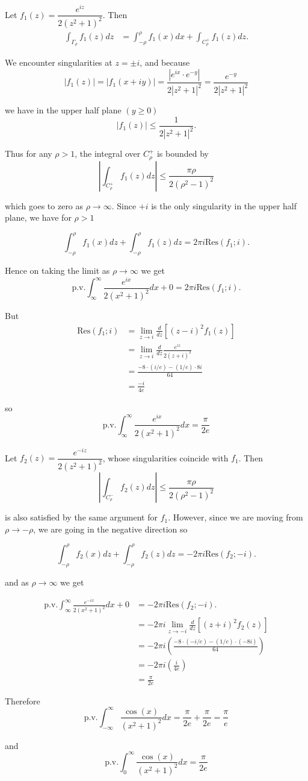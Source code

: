 \documentclass[12pt]{article}
\begin{document}
Let $f_1(z) = \dfrac{e^{iz}}{2(z^2 + 1)^2}$. Then
\begin{align*}
	\int_{\Gamma_{\rho}} f_1(z)dz &= \int_{-\rho}^{\rho} f_1(x)dx + \int_{C_{\rho}^{+}}f_1(z)dz. 
\end{align*}

We encounter singularities at $z = \pm i$, and because
\[
	|f_1(z)| = |f_1(x + iy)| = \frac{\left|e^{ix}\cdot e^{-y}\right|}{2|z^2 + 1|^2} = \frac{e^{-y}}{2|z^2 + 1|^2}
\]

we have in the upper half plane $(y \ge 0)$
\[
	|f_1(z)| \le \frac{1}{2|z^2 + 1|^2}.
\]

Thus for any $\rho > 1$, the integral over $C_{\rho}^{+}$ is bounded by
\[
	\left|\int_{C_{\rho}^{+}} f_1(z)dz\right| \le  \frac{\pi \rho}{2(\rho^2 - 1)^2}
\]

which goes to zero as $\rho \to \infty$. Since $+i$ is the only singularity in the upper half plane, we have for $\rho > 1$

\[
	\int_{-\rho}^{\rho} f_1(x)dz + \int_{-\rho}^{\rho} f_1(z)dz = 2\pi i \text{Res}(f_1; i).
\]

Hence on taking the limit as $\rho \to \infty$ we get
\[
	\text{p.v.}\int_{\infty}^{\infty} \frac{e^{ix}}{2(x^2 + 1)^2}dx + 0 = 2\pi i\text{Res}(f_1; i).
\]

But
\begin{align*}
	\text{Res}(f_1; i) &= \lim_{z \to i} \frac{d}{dz} [(z - i)^2f_1(z)] \\
			   &= \lim_{z \to i} \frac{d}{dz} \frac{e^{iz}}{2(z + i)^2} \\
			   &= \frac{-8\cdot(i/e) - (1/e)\cdot8i}{64} \\
			   &= \frac{-i}{4e}
\end{align*}

so
\[
	\text{p.v.}\int_{\infty}^{\infty} \frac{e^{ix}}{2(x^2 + 1)^2}dx = \frac{\pi}{2e}
\]

Let $f_2(z) = \dfrac{e^{-iz}}{2(z^2 + 1)^2}$, whose singularities coincide with $f_1$. Then
\[
	\left|\int_{C_{\rho}^{-}} f_2(z)dz\right| \le  \frac{\pi \rho}{2(\rho^2 - 1)^2}
\]

is also satisfied by the same argument for $f_1$. However, since we are moving from $\rho \to -\rho$, we are going in the negative direction so

\[
	\int_{-\rho}^{\rho} f_2(x)dz + \int_{-\rho}^{\rho} f_2(z)dz = -2\pi i \text{Res}(f_2; -i).	
\]

and as $\rho \to \infty$ we get

\begin{align*}
	\text{p.v.}\int_{\infty}^{\infty} \frac{e^{-ix}}{2(x^2 + 1)^2}dx + 0 &= -2\pi i\text{Res}(f_2; -i). \\
									     &= -2\pi i \lim_{z \to -i} \frac{d}{dz}[(z + i)^2f_2(z)] \\
									     &= -2\pi i \left(\frac{-8\cdot(-i/e) - (1/e)\cdot(-8i)}{64}\right) \\
									     &= -2\pi i\left(\frac{i}{4e}\right) \\
									     &= \frac{\pi}{2e}
\end{align*}

Therefore
\[
	\text{p.v.}\int_{-\infty}^{\infty} \frac{\cos(x)}{(x^2 + 1)^2}dx = \frac{\pi}{2e} + \frac{\pi}{2e} = \frac{\pi}{e}
\]

and
\[
	\text{p.v.}\int_{0}^{\infty} \frac{\cos(x)}{(x^2 + 1)^2}dx = \frac{\pi}{2e}	
\]
\end{document}
